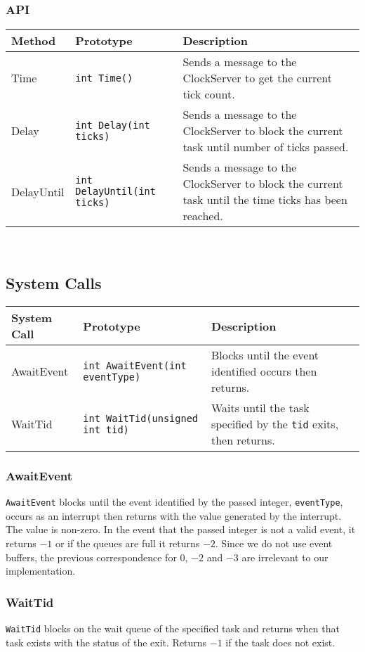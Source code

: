 \documentclass[12pt]{article}
\begin{document}
\subsubsection{API}
\begin{tabular}{|l|l|p{}|}
  \hline
  {\bf Method} & {\bf Prototype} & {\bf Description} \\\hline
  Time & \texttt{int Time()} & Sends a message to the ClockServer to get the current tick count. \\\hline
  Delay & \texttt{int Delay(int ticks)} & Sends a message to the ClockServer to block the current task until number of ticks passed. \\\hline
  DelayUntil & \texttt{int DelayUntil(int ticks)} & Sends a message to the ClockServer to block the current task until the time ticks has been reached. \\\hline
\end{tabular}
\\[2\baselineskip]

\subsection{System Calls}
\begin{tabular}{|l|l|p{}|}
  \hline
  {\bf System Call} & {\bf Prototype} & {\bf Description} \\\hline
  AwaitEvent & \texttt{int AwaitEvent(int eventType)} & Blocks until the event identified occurs then returns. \\\hline
  WaitTid & \texttt{int WaitTid(unsigned int tid)} & Waits until the task specified by the \texttt{tid} exits, then returns. \\\hline
\end{tabular}
\subsubsection{AwaitEvent}
\texttt{AwaitEvent} blocks until the event identified by the passed integer, \texttt{eventType}, occurs as an interrupt then returns with the value generated by the interrupt.  The value is non-zero.  In the event that the passed integer is not a valid event, it returns $-1$ or if the queues are full it returns $-2$.  Since we do not use event buffers, the previous correspondence for $0$, $-2$ and $-3$ are irrelevant to our implementation.
\\[1\baselineskip]
\subsubsection{WaitTid}
\texttt{WaitTid} blocks on the wait queue of the specified task and returns when that task exists with the status of the exit.  Returns $-1$ if the task does not exist.
\\[2\baselineskip]
\end{document}
